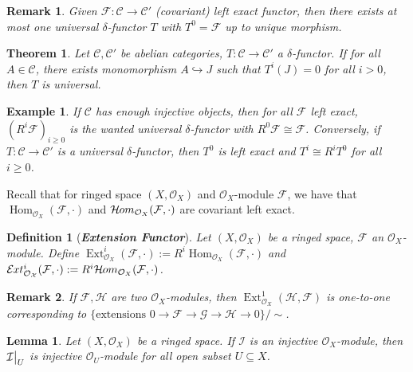\documentclass{ctexart}
\newtheorem{definition}{Definition}[section]
\newtheorem{remark}{Remark}[section]
\newtheorem{theorem}{Theorem}[section]
\newtheorem{lemma}{Lemma}[section]
\newtheorem{example}{Example}[section]
\renewcommand{\hom}{\operatorname{Hom}}
\newcommand{\ext}{\operatorname{Ext}}
\newcommand{\sheafhom}{\mathcal{H}\kern -.5pt om}
\newcommand{\sheafext}{\mathcal{E}\kern -.5pt xt}
\begin{document}
\begin{remark}
    Given $\mathcal{F}: \mathcal{C} \longrightarrow \mathcal{C}'$ (covariant) left exact functor,
    then there exists at most one universal $\delta$-functor $T$ with $T^{0} = \mathcal{F}$ up to unique morphism.
\end{remark}
\begin{theorem}
    Let $\mathcal{C}, \mathcal{C}'$ be abelian categories, $T: \mathcal{C} \longrightarrow \mathcal{C}'$ a $\delta$-functor.
    If for all $A\in \mathcal{C}$, there exists monomorphism $A \hookrightarrow J$ such that $T^{i}(J) = 0$ for all $i > 0$,
    then $T$ is universal.
    \label{Theorem 11.1}
\end{theorem}
\begin{example}
    If $\mathcal{C}$ has enough injective objects, then for all $\mathcal{F}$ left exact, $(R^{i}\mathcal{F})_{i \ge 0}$ is the wanted universal $\delta$-functor with $R^{0}\mathcal{F} \cong \mathcal{F}$.
    Conversely, if $T: \mathcal{C} \longrightarrow \mathcal{C}'$ is a universal $\delta$-functor, 
    then $T^{0}$ is left exact and $T^{i} \cong R^{i}T^{0}$ for all $i \ge 0$.
\end{example}
Recall that for ringed space $(X, \mathcal{O}_{X})$ and $\mathcal{O}_{X}$-module $\mathcal{F}$, we have that $\hom_{\mathcal{O}_{X}}(\mathcal{F}, \cdot)$ and $\sheafhom_{\mathcal{O}_{X}}(\mathcal{F}, \cdot)$ are covariant left exact.
\begin{definition}[\textbf{\emph{Extension Functor}}]
    Let $(X, \mathcal{O}_{X})$ be a ringed space, $\mathcal{F}$ an $\mathcal{O}_{X}$-module.
    Define $\ext_{\mathcal{O}_{X}}^{i}(\mathcal{F}, \cdot) := R^{i}\hom_{\mathcal{O}_{X}}(\mathcal{F}, \cdot)$ and $\sheafext_{\mathcal{O_{X}}}^{i}(\mathcal{F}, \cdot) := R^{i}\sheafhom_{\mathcal{O}_{X}}(\mathcal{F}, \cdot)$.
\end{definition}
\begin{remark}
    If $\mathcal{F}, \mathcal{H}$ are two $\mathcal{O}_{X}$-modules, then $\ext_{\mathcal{O}_{X}}^{1}(\mathcal{H}, \mathcal{F})$ is one-to-one corresponding to $\{\text{extensions }0 \rightarrow \mathcal{F} \rightarrow \mathcal{G} \rightarrow \mathcal{H} \rightarrow 0\}/\sim$.
\end{remark}
\begin{lemma}
    Let $(X, \mathcal{O}_{X})$ be a ringed space.
    If $\mathcal{I}$ is an injective $\mathcal{O}_{X}$-module, then $\mathcal{I}\big{|}_{U}$ is injective $\mathcal{O}_{U}$-module for all open subset $U \subseteq X$.
    \label{Lemma 11.1}
\end{lemma}
\end{document}
